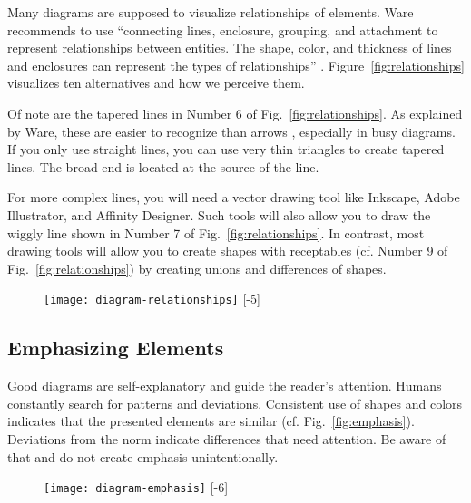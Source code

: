Many diagrams are supposed to visualize relationships of elements. Ware recommends to use ``connecting lines, enclosure, grouping, and attachment to represent relationships between entities. The shape, color, and thickness of lines and enclosures can represent the types of relationships'' \cite{Ware12}. Figure~\ref{fig:relationships} visualizes ten alternatives and how we perceive them.

Of note are the tapered lines in Number 6 of Fig.~\ref{fig:relationships}. As explained by Ware, these are easier to recognize than arrows \cite{Ware12}, especially in busy diagrams. If you only use straight lines, you can use very thin triangles to create tapered lines. The broad end is located at the source of the line.

For more complex lines, you will need a vector drawing tool like Inkscape, Adobe Illustrator, and Affinity Designer. Such tools will also allow you to draw the wiggly line shown in Number 7 of Fig.~\ref{fig:relationships}. In contrast, most drawing tools will allow you to create shapes with receptables (cf. Number 9 of Fig.~\ref{fig:relationships}) by creating unions and differences of shapes.



\begin{figure}[t]
\centering
\texttt{[image: diagram-relationships]}
[-5\baselineskip]
\end{figure}



\subsection{Emphasizing Elements}

Good diagrams are self-explanatory and guide the reader's attention. Humans constantly search for patterns and deviations. Consistent use of shapes and colors indicates that the presented elements are similar (cf. Fig.~\ref{fig:emphasis}). Deviations from the norm indicate differences that need attention. Be aware of that and do not create emphasis unintentionally.

\begin{figure}[t]
\centering
\texttt{[image: diagram-emphasis]}
[-6\baselineskip]
\end{figure}

